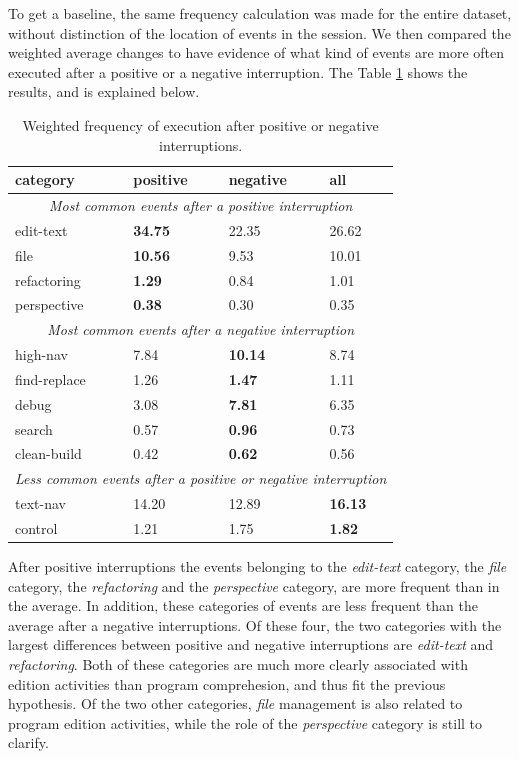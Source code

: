 \documentclass[times]{smrauth}
\begin{document}
To get a baseline, the same frequency calculation was made for the entire dataset, without distinction of the location of events in the session. We then compared the weighted average changes to have evidence of what kind of events are more often executed after a positive or a negative interruption. The Table \ref{tbl:stats_events} shows the results, and is explained below.

\begin{table}[ht!]
\small
\renewcommand{\arraystretch}{1.3}
\caption{Weighted frequency of execution after positive or negative interruptions. }
\label{tbl:stats_events}
\centering
\begin{tabular}{|p{3cm}|p{2cm} |p{2cm}|p{2cm}|} 
  \hline 
category & positive & negative & all \\  
  \hline 
\multicolumn{4}{c}{\textit{Most common events after a positive interruption}} \\
    \hline 
edit-text &  \textbf{34.75} & 22.35 & 26.62 \\
file &  \textbf{10.56} & 9.53 & 10.01\\
refactoring & \textbf{1.29} & 0.84 & 1.01 \\
perspective & \textbf{0.38} & 0.30 & 0.35  \\
    \hline 
\multicolumn{4}{c}{\textit{Most common events after a negative interruption}} \\
    \hline 
high-nav & 7.84 & \textbf{10.14} & 8.74  \\
find-replace & 1.26 & \textbf{1.47} & 1.11 \\
debug & 3.08 & \textbf{7.81} & 6.35  \\
search & 0.57 & \textbf{0.96} & 0.73 \\
clean-build & 0.42 & \textbf{0.62} & 0.56  \\
    \hline 
\multicolumn{4}{c}{\textit{Less common events after a positive or negative interruption}} \\
    \hline 
text-nav & 14.20 & 12.89 & \textbf{16.13} \\
control & 1.21 & 1.75 & \textbf{1.82} \\
\hline
\end{tabular}
\end{table}

After positive interruptions the events belonging to the \emph{edit-text} category, the \emph{file} category, the \emph{refactoring} and the \emph{perspective} category, are more frequent than in the average. In addition, these categories of events are less frequent than the average after a negative interruptions. Of these four, the two categories with the largest differences between positive and negative interruptions are \emph{edit-text} and \emph{refactoring}. Both of these categories are much more clearly associated with edition activities than program comprehesion, and thus fit the previous hypothesis. Of the two other categories, \emph{file} management is also related to program edition activities, while the role of the \emph{perspective} category is still to clarify.
\end{document}
